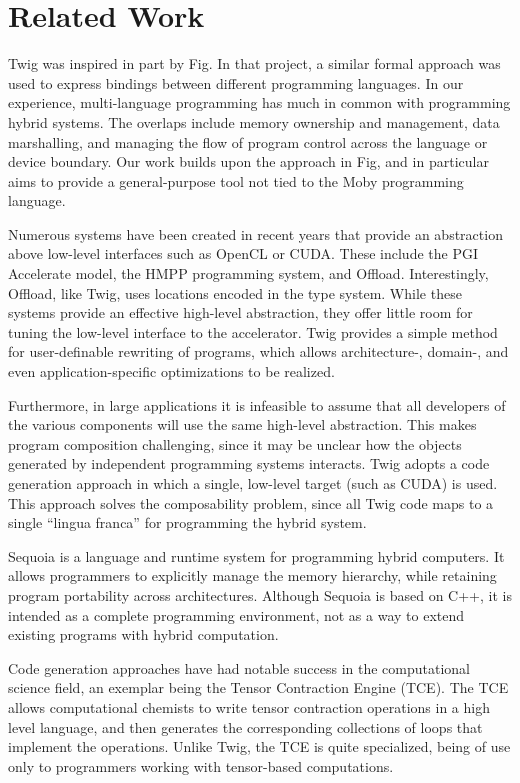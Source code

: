 
\section{Related Work}

Twig was inspired in part by Fig\cite{fig}. In that project, a similar formal approach was used to express bindings between different programming languages. In our experience, multi-language programming has much in common with programming hybrid systems. The overlaps include memory ownership and management, data marshalling, and managing the flow of program control across the language or device boundary. Our work builds upon the approach in Fig, and in particular aims to provide a general-purpose tool not tied to the Moby\cite{moby} programming language.

Numerous systems have been created in recent years that provide an abstraction above low-level interfaces such as OpenCL or CUDA. These include the PGI Accelerate model\cite{pgi-accelerate}, the HMPP programming system\cite{hmpp}, and Offload\cite{offload}. Interestingly, Offload, like Twig, uses locations encoded in the type system. While these systems provide an effective high-level abstraction, they offer little room for tuning the low-level interface to the accelerator. Twig provides a simple method for user-definable rewriting of programs, which allows architecture-, domain-, and even application-specific optimizations to be realized.

Furthermore, in large applications it is infeasible to assume that all developers of the various components will use the same high-level abstraction. This makes program composition challenging, since it may be unclear how the objects generated by independent programming systems interacts. Twig adopts a code generation approach in which a single, low-level target (such as CUDA) is used. This approach solves the composability problem, since all Twig code maps to a single ``lingua franca'' for programming the hybrid system.

Sequoia\cite{sequoia} is a language and runtime system for programming hybrid computers. It allows programmers to explicitly manage the memory hierarchy, while retaining program portability across architectures. Although Sequoia is based on C++, it is intended as a complete programming environment, not as a way to extend existing programs with hybrid computation.

Code generation approaches have had notable success in the computational science field, an exemplar being the Tensor Contraction Engine (TCE)\cite{baumgartner05synthesis}. The TCE allows computational chemists to write tensor contraction operations in a high level language, and then generates the corresponding collections of loops that implement the operations. Unlike Twig, the TCE is quite specialized, being of use only to programmers working with tensor-based computations.
